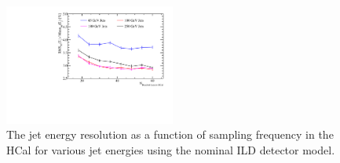 \begin{figure}[h!]
\centering
\includegraphics[width=0.5\textwidth]{OptimisationStudies/Plots/JetEnergyResolutions/JER_vs_NumberOfLayersInTheHCal.pdf}
\caption[The jet energy resolution as a function of sampling frequency in the HCal for various jet energies using the nominal ILD detector model.]{The jet energy resolution as a function of sampling frequency in the HCal for various jet energies using the nominal ILD detector model.}
\label{fig:hcalnlayers}
\end{figure}

